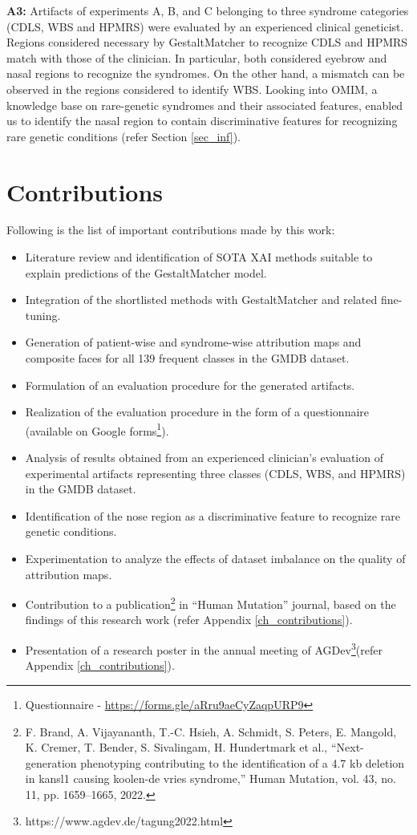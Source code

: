 \documentclass[../report.tex]{subfiles}
\begin{document}
	\textbf{A3:} Artifacts of experiments A, B, and C belonging to three syndrome categories (CDLS, WBS and HPMRS) were evaluated by an experienced clinical geneticist. Regions considered necessary by GestaltMatcher to recognize CDLS and HPMRS match with those of the clinician. In particular, both considered eyebrow and nasal regions to recognize the syndromes. On the other hand, a mismatch can be observed in the regions considered to identify WBS. Looking into OMIM, a knowledge base on rare-genetic syndromes and their associated features, enabled us to identify the nasal region to contain discriminative features for recognizing rare genetic conditions (refer Section \ref{sec_inf}).
	
    \section{Contributions}
	Following is the list of important contributions made by this work:
	\begin{itemize}
	\item Literature review and identification of SOTA XAI methods suitable to explain predictions of the GestaltMatcher model.
	\item Integration of the shortlisted methods with GestaltMatcher and related fine-tuning.
	\item Generation of patient-wise and syndrome-wise attribution maps and composite faces for all 139 frequent classes in the GMDB dataset.
	\item Formulation of an evaluation procedure for the generated artifacts.
	\item Realization of the evaluation procedure in the form of a questionnaire (available on Google forms\footnote[1]{Questionnaire - \url{https://forms.gle/aRru9aeCyZaqpURP9}}).
	\item Analysis of results obtained from an experienced clinician's evaluation of experimental artifacts representing three classes (CDLS, WBS, and HPMRS) in the GMDB dataset.
	\item Identification of the nose region as a discriminative feature to recognize rare genetic conditions.
	\item Experimentation to analyze the effects of dataset imbalance on the quality of attribution maps.
	\item Contribution to a publication\footnote[2]{F. Brand, A. Vijayananth, T.-C. Hsieh, A. Schmidt, S. Peters, E. Mangold, K. Cremer, T. Bender,
		S. Sivalingam, H. Hundertmark et al., “Next-generation phenotyping contributing to the identification
		of a 4.7 kb deletion in kansl1 causing koolen-de vries syndrome,” Human Mutation, vol. 43, no. 11,
		pp. 1659–1665, 2022.} in \enquote{Human Mutation} journal, based on the findings of this research work (refer Appendix \ref{ch_contributions}).
	\item Presentation of a research poster in the annual meeting of AGDev\footnote[3]{https://www.agdev.de/tagung2022.html}(refer Appendix \ref{ch_contributions}).
	\end{itemize}
\end{document}
